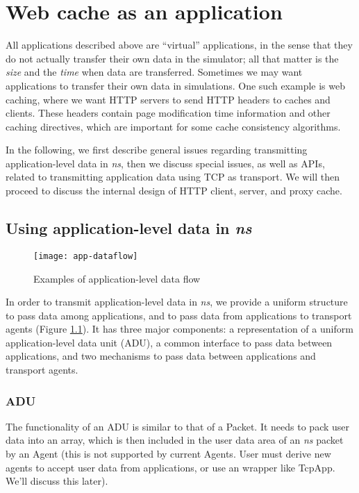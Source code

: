 \chapter{Web cache as an application}
\label{chap:webcache}

All applications described above are ``virtual'' applications, in the sense
that they do not actually transfer their own data in the simulator; all 
that matter is the \emph{size} and the \emph{time} when data are transferred.
Sometimes we may want applications to transfer their own data in simulations.
One such example is web caching, where we want HTTP servers to send HTTP 
headers to caches and clients. These headers contain 
page modification time information and other caching directives, which are 
important for some cache consistency algorithms.

In the following, we first describe general issues regarding
transmitting application-level data in \emph{ns}, then we discuss special
issues, as well as APIs, related to transmitting application data
using TCP as transport. We will then proceed to discuss the internal
design of HTTP client, server, and proxy cache. 

\section{Using application-level data in \emph{ns}}

\begin{figure}[tb]
  \begin{center}
    \centerline{\texttt{[image: app-dataflow]}}
    \caption{Examples of application-level data flow}
    \label{fig:app-dataflow}
  \end{center}
\end{figure}

In order to transmit application-level data in \emph{ns}, we provide a 
uniform structure to pass data among applications, and to
pass data from applications to transport agents (Figure
\ref{fig:app-dataflow}). It has three major components: 
a representation of a uniform application-level data unit (ADU), a 
common interface to pass data between applications, and two mechanisms
to pass data between applications and transport agents.

\subsection{ADU} 

The functionality of an ADU is similar to that of a Packet. It needs to
pack user data into an array, which is then included in the user data
area of an \emph{ns} packet by an Agent (this is not supported by current
Agents. User must derive new agents to accept user data from
applications, or use an wrapper like TcpApp. We'll discuss this
later). 

